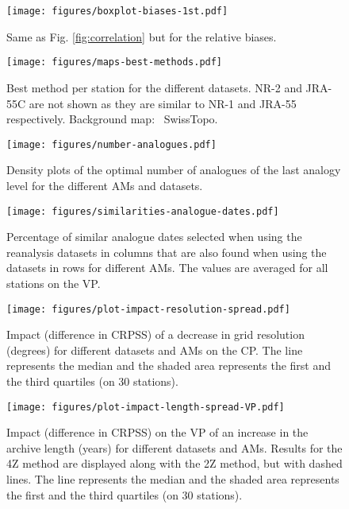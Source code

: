 \documentclass{ametsoc}
\begin{document}
\begin{figure*}[t]
	\noindent\texttt{[image: figures/boxplot-biases-1st.pdf]}\\
	\caption{Same as Fig. \ref{fig:correlation} but for the relative biases.}
	\label{fig:biases}
\end{figure*}

\begin{figure*}[t]
	\noindent\texttt{[image: figures/maps-best-methods.pdf]}\\
	\caption{Best method per station for the different datasets. NR-2 and JRA-55C are not shown as they are similar to NR-1 and JRA-55 respectively. Background map: \textcopyright\ SwissTopo.}
	\label{fig:map_best_methods}
\end{figure*}

\begin{figure}[t]
	\noindent\texttt{[image: figures/number-analogues.pdf]}\\
	\caption{Density plots of the optimal number of analogues of the last analogy level for the different AMs and datasets.}
	\label{fig:number_analogues}
\end{figure}

\begin{figure}[t]
	\noindent\texttt{[image: figures/similarities-analogue-dates.pdf]}\\
	\caption{Percentage of similar analogue dates selected when using the reanalysis datasets in columns that are also found when using the datasets in rows for different AMs. The values are averaged for all stations on the VP.}
	\label{fig:similarities_analogue_dates}
\end{figure}

\begin{figure}[t]
	\noindent\texttt{[image: figures/plot-impact-resolution-spread.pdf]}\\
	\caption{Impact (difference in CRPSS) of a decrease in grid resolution (degrees) for different datasets and AMs on the CP. The line represents the median and the shaded area represents the first and the third quartiles (on 30 stations).}
	\label{fig:plot_impact_resolution}
\end{figure}

\begin{figure}[t]
	\noindent\texttt{[image: figures/plot-impact-length-spread-VP.pdf]}\\
	\caption{Impact (difference in CRPSS) on the VP of an increase in the archive length (years) for different datasets and AMs. Results for the 4Z method are displayed along with the 2Z method, but with dashed lines. The line represents the median and the shaded area represents the first and the third quartiles (on 30 stations).}
	\label{fig:plot_impact_length}
\end{figure}
\end{document}
